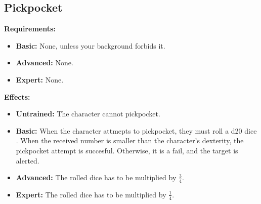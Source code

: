 \subsection{Pickpocket}
\begin{table}[!ht]
\centering
{}
\end{table}
\textbf{Requirements:}
\begin{itemize}
	\item \textbf{Basic:} None, unless your background forbids it.
	\item \textbf{Advanced:} None.
	\item \textbf{Expert:} None.
\end{itemize}
\textbf{Effects:}
\begin{itemize}
	\item \textbf{Untrained:} The character cannot pickpocket.
	\item \textbf{Basic:} When the character attmepts to pickpocket, they must roll a d20 dice . When the received number is smaller than the character's dexterity, the pickpocket attempt is succesful. Otherwise, it is a fail, and the target is alerted.
	\item \textbf{Advanced:} The rolled dice has to be multiplied by \( \frac{3}{4} \).
	\item \textbf{Expert:} The rolled dice has to be multiplied by \( \frac{1}{4} \).
\end{itemize}\newpage
